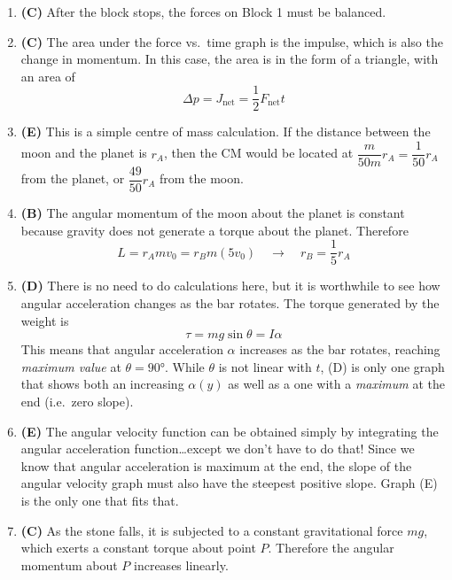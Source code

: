 \documentclass{../oss-handout}
\begin{document}
\begin{enumerate}[leftmargin=17pt]
\item\textbf{(C)} After the block stops, the forces on Block 1 must be balanced.
  
\item\textbf{(C)} The area under the force vs.\ time graph is the impulse,
  which is also the change in momentum. In this case, the area is in the form
  of a triangle, with an area of
  \begin{equation*}
    \Delta p = J_\text{net} = \boxed{\frac12 F_\text{net}t}
  \end{equation*}

\item\textbf{(E)} This is a simple centre of mass calculation. If the distance
  between the moon and the planet is $r_A$, then the CM would be located at
  $\dfrac m{50m}r_A=\dfrac1{50}r_A$ from the planet, or
  $\boxed{\dfrac{49}{50}r_A}$ from the moon.
 
\item\textbf{(B)} The angular momentum of the moon about the planet is constant
  because gravity does not generate a torque about the planet. Therefore
  \begin{displaymath}
    L=r_Amv_0=r_Bm(5v_0)\quad\longrightarrow\quad
    r_B=\boxed{\frac15r_A}
  \end{displaymath}

\item\textbf{(D)} There is no need to do calculations here, but it is worthwhile
  to see how angular acceleration changes as the bar rotates. The torque
  generated by the weight is
  \begin{displaymath}
    \tau=mg\sin\theta=I\alpha
  \end{displaymath}
  This means that angular acceleration $\alpha$ increases as the bar rotates,
  reaching \emph{maximum value} at $\theta=\ang{90}$. While $\theta$ is not
  linear with $t$, (D) is only one graph that shows both an increasing
  $\alpha(y)$ as well as a one with a \emph{maximum} at the end (i.e.\ zero
  slope).
  
\item\textbf{(E)} The angular velocity function can be obtained simply by
  integrating the angular acceleration function\ldots except we don't have to
  do that! Since we know that angular acceleration is maximum at the end,
  the slope of the angular velocity graph must also have the steepest positive
  slope. Graph (E) is the only one that fits that.

\item\textbf{(C)} As the stone falls, it is subjected to a constant
  gravitational force $mg$, which exerts a constant torque about point $P$.
  Therefore the angular momentum about $P$ increases linearly.


\end{enumerate}
\end{document}
